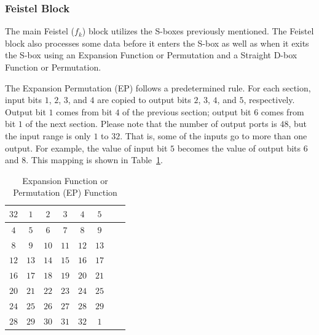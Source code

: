 \documentclass{article}
\begin{document}
\subsubsection{Feistel Block}

The main Feistel ($f_k$) block utilizes the S-boxes previously
mentioned.  The Feistel block also processes some data before it
enters the S-box as well as when it exits the S-box using an
Expansion Function or Permutation and a Straight D-box Function or
Permutation.

The Expansion
Permutation (EP) follows a predetermined rule. For each
section, input bits $1$, $2$, $3$, and $4$ are copied to output
bits $2$, $3$, $4$, and $5$, respectively. Output bit $1$ comes
from bit $4$ of the previous section; output bit $6$ comes
from bit $1$ of the next section.
Please note that the number of output ports is $48$, but
the input range is only $1$ to $32$.
That is, some of the inputs go to more than one output.
For example, the value of input bit $5$ becomes the value of output
bits $6$ and $8$.  This mapping is shown in Table~\ref{ep.tbl}.  
\begin{table}
  \centering
  \begin{tabular} {|c|c|c|c|c|c|c|c|} \hline
    $32$ & $1$  & $2$  & $3$  & $4$  & $5$ \\ \hline
    $4$  & $5$  & $6$  & $7$  & $8$  & $9$ \\ \hline
    $8$  & $9$  & $10$ & $11$ & $12$ & $13$ \\ \hline
    $12$ & $13$ & $14$ & $15$ & $16$ & $17$ \\ \hline
    $16$ & $17$ & $18$ & $19$ & $20$ & $21$ \\ \hline        
    $20$ & $21$ & $22$ & $23$ & $24$ & $25$ \\ \hline
    $24$ & $25$ & $26$ & $27$ & $28$ & $29$ \\ \hline
    $28$ & $29$ & $30$ & $31$ & $32$ & $1$  \\ \hline        
\end{tabular}
\caption{Expansion Function or Permutation (EP) Function}
\label{ep.tbl}
\end{table}
\end{document}
